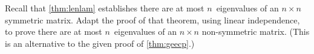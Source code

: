 \begin{exercise} \label{ex:lenlam} 
Recall that \autoref{thm:lenlam} establishes there are at most \(n\)~eigenvalues of an \(n\times n\) symmetric matrix.
Adapt the proof of that theorem, using linear independence, to prove there are at most \(n\)~eigenvalues of an \(n\times n\) non-symmetric matrix.
(This is an alternative to the given proof of \autoref{thm:geecp}.)
\end{exercise}




